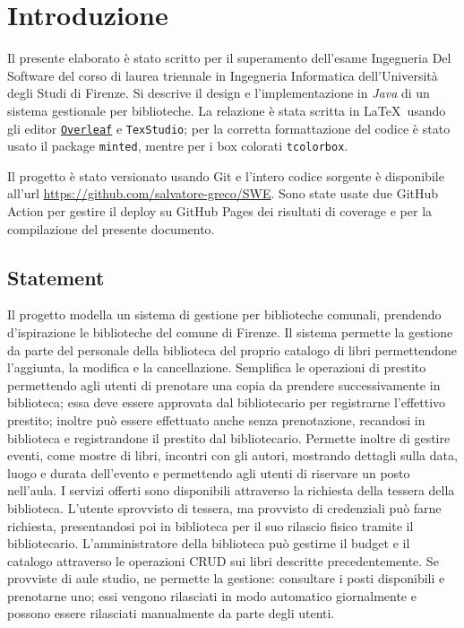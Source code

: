 \section{Introduzione}
Il presente elaborato è stato scritto per il superamento dell'esame Ingegneria Del Software del corso di laurea triennale in Ingegneria Informatica dell'Università degli Studi di Firenze.\newline
Si descrive il design e l'implementazione in \textit{Java} di un sistema gestionale per biblioteche. \newline
La relazione è stata scritta in \LaTeX\ usando gli editor \href{https://overleaf.com}{\texttt{Overleaf}} e \texttt{TexStudio}; per la corretta formattazione del codice è stato usato il package \texttt{minted}, mentre per i box colorati \texttt{tcolorbox}.

Il progetto è stato versionato usando Git e l'intero codice sorgente è disponibile all'url \url{https://github.com/salvatore-greco/SWE}. Sono state usate due GitHub Action per gestire il deploy su GitHub Pages dei risultati di coverage e per la compilazione del presente documento.


\subsection{Statement}
Il progetto modella un sistema di gestione per biblioteche comunali, prendendo d'ispirazione le biblioteche del comune di Firenze.
Il sistema permette la gestione da parte del personale della biblioteca del proprio catalogo di libri permettendone l'aggiunta, la modifica e la cancellazione. Semplifica le operazioni di prestito permettendo agli utenti di prenotare una copia da prendere successivamente in biblioteca; essa deve essere approvata dal bibliotecario per registrarne l'effettivo prestito; inoltre può essere effettuato anche senza prenotazione, recandosi in biblioteca e registrandone il prestito dal bibliotecario. Permette inoltre di gestire eventi, come mostre di libri, incontri con gli autori, mostrando dettagli sulla data, luogo e durata dell'evento e permettendo agli utenti di riservare un posto nell'aula. 
I servizi offerti sono disponibili attraverso la richiesta della tessera della biblioteca. L'utente sprovvisto di tessera, ma provvisto di credenziali può farne richiesta, presentandosi poi in biblioteca per il suo rilascio fisico tramite il bibliotecario.
L'amministratore della biblioteca può gestirne il budget e il catalogo attraverso le operazioni CRUD sui libri descritte precedentemente.
Se provviste di aule studio, ne permette la gestione: consultare i posti disponibili  e prenotarne uno; essi vengono rilasciati in modo automatico giornalmente e possono essere rilasciati manualmente da parte degli utenti.    

